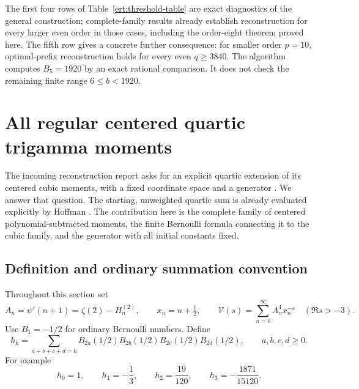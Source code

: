 \documentclass[11pt,a4paper]{article}
\numberwithin{equation}{section}
\theoremstyle{plain}
\theoremstyle{definition}
\theoremstyle{remark}
\begin{document}
The first four rows of Table~\ref{ert:threshold-table} are exact
diagnostics of the general construction; complete-family results
already establish reconstruction for every larger even order in those
cases, including the order-eight theorem proved here. The fifth row
gives a concrete further consequence: for smaller order $p=10$,
optimal-prefix reconstruction holds for every even $q\ge3840$.
The algorithm computes $B_5=1920$ by an exact rational comparison.
It does not check the remaining finite range $6\le b<1920$.




\section{All regular centered quartic trigamma moments}
\label{qtm:section}

The incoming reconstruction report asks for an explicit quartic extension
of its centered cubic moments, with a fixed coordinate space and a
generator \cite[Question 5 and Section 6]{Reconstruction}.  We answer that
question.  The starting, unweighted quartic sum is already evaluated
explicitly by Hoffman \cite[Corollary 4.4 and the following example]{Hoffman}.
The contribution here is the complete family of centered
polynomial-subtracted moments, the finite Bernoulli formula connecting it
to the cubic family, and the generator with all initial constants fixed.

\subsection{Definition and ordinary summation convention}

Throughout this section set
\begin{equation}\label{qtm:definitions}
 A_n=\psi'(n+1)=\zeta(2)-H_n^{(2)},\qquad
 x_n=n+\tfrac12,\qquad
 \mathcal V(s)=\sum_{n=0}^{\infty}A_n^4x_n^{-s}
 \quad(\Re s>-3).
\end{equation}
Use $B_1=-1/2$ for ordinary Bernoulli numbers.  Define
\begin{equation}\label{qtm:h}
 h_k=\sum_{a+b+c+d=k}
 B_{2a}(1/2)B_{2b}(1/2)B_{2c}(1/2)B_{2d}(1/2),
 \qquad a,b,c,d\ge0.
\end{equation}
For example
\[
 h_0=1,\qquad h_1=-\frac13,\qquad h_2=\frac{19}{120},
 \qquad h_3=-\frac{1871}{15120}.
\]
\end{document}
